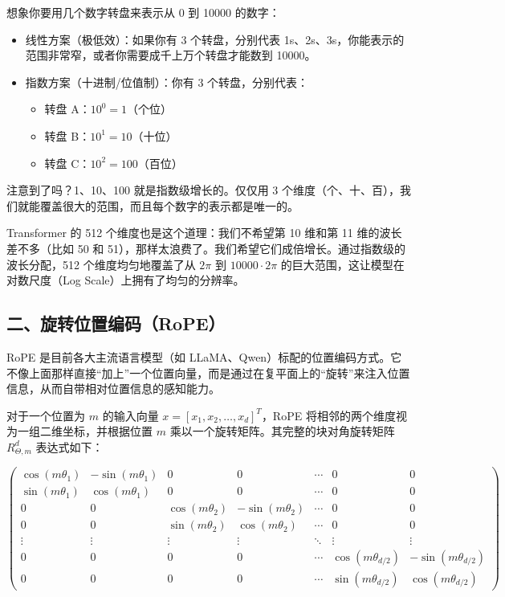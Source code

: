 想象你要用几个数字转盘来表示从 0 到 10000 的数字：

\begin{itemize}
\tightlist
\item
  线性方案（极低效）：如果你有 3 个转盘，分别代表 1s、2s、3s，你能表示的范围非常窄，或者你需要成千上万个转盘才能数到 10000。
\item
  指数方案（十进制/位值制）：你有 3 个转盘，分别代表：

  \begin{itemize}
  \tightlist
  \item
    转盘 A：\(10^0=1\)（个位）
  \item
    转盘 B：\(10^1=10\)（十位）
  \item
    转盘 C：\(10^2=100\)（百位）
  \end{itemize}
\end{itemize}

注意到了吗？1、10、100 就是指数级增长的。仅仅用 3 个维度（个、十、百），我们就能覆盖很大的范围，而且每个数字的表示都是唯一的。

Transformer 的 512 个维度也是这个道理：我们不希望第 10 维和第 11 维的波长差不多（比如 50 和 51），那样太浪费了。我们希望它们成倍增长。通过指数级的波长分配，512 个维度均匀地覆盖了从 \(2\pi\) 到 \(10000\cdot2\pi\) 的巨大范围，这让模型在对数尺度（Log Scale）上拥有了均匀的分辨率。

\hypertarget{ux4e8cux65cbux8f6cux4f4dux7f6eux7f16ux7801rope}{%
\subsection{二、旋转位置编码（RoPE）}\label{ux4e8cux65cbux8f6cux4f4dux7f6eux7f16ux7801rope}}

RoPE 是目前各大主流语言模型（如 LLaMA、Qwen）标配的位置编码方式。它不像上面那样直接``加上''一个位置向量，而是通过在复平面上的``旋转''来注入位置信息，从而自带相对位置信息的感知能力。

对于一个位置为 \(m\) 的输入向量 \(x=[x_1,x_2,\ldots,x_d]^T\)，RoPE 将相邻的两个维度视为一组二维坐标，并根据位置 \(m\) 乘以一个旋转矩阵。其完整的块对角旋转矩阵 \(R_{\Theta,m}^{d}\) 表达式如下：

\[
\begin{pmatrix}
\cos(m\theta_1) & -\sin(m\theta_1) & 0 & 0 & \cdots & 0 & 0 \\
\sin(m\theta_1) & \cos(m\theta_1) & 0 & 0 & \cdots & 0 & 0 \\
0 & 0 & \cos(m\theta_2) & -\sin(m\theta_2) & \cdots & 0 & 0 \\
0 & 0 & \sin(m\theta_2) & \cos(m\theta_2) & \cdots & 0 & 0 \\
\vdots & \vdots & \vdots & \vdots & \ddots & \vdots & \vdots \\
0 & 0 & 0 & 0 & \cdots & \cos(m\theta_{d/2}) & -\sin(m\theta_{d/2}) \\
0 & 0 & 0 & 0 & \cdots & \sin(m\theta_{d/2}) & \cos(m\theta_{d/2})
\end{pmatrix}
\]

